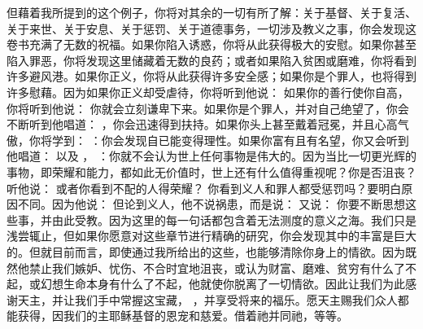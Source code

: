 但藉着我所提到的这个例子，你将对其余的一切有所了解：关于基督、关于复活、关于来世、关于安息、关于惩罚、关于道德事务，一切涉及教义之事，你会发现这卷书充满了无数的祝福。如果你陷入诱惑，你将从此获得极大的安慰。如果你甚至陷入罪恶，你将发现这里储藏着无数的良药；或者如果陷入贫困或磨难，你将看到许多避风港。如果你正义，你将从此获得许多安全感；如果你是个罪人，也将得到许多慰藉。因为如果你正义却受虐待，你将听到他说：    如果你的善行使你自高，你将听到他说：  你就会立刻谦卑下来。如果你是个罪人，并对自己绝望了，你会不断听到他唱道： ，你会迅速得到扶持。如果你头上甚至戴着冠冕，并且心高气傲，你将学到： ：你会发现自已能变得理性。如果你富有且有名望，你又会听到他唱道：  以及 ， ：你就不会认为世上任何事物是伟大的。因为当比一切更光辉的事物，即荣耀和能力，都如此无价值时，世上还有什么值得重视呢？你是否沮丧？听他说：  或者你看到不配的人得荣耀？  你看到义人和罪人都受惩罚吗？要明白原因不同。因为他说：  但论到义人，他不说祸患，而是说：  又说：    你要不断思想这些事，并由此受教。因为这里的每一句话都包含着无法测度的意义之海。我们只是浅尝辄止，但如果你愿意对这些章节进行精确的研究，你会发现其中的丰富是巨大的。但就目前而言，即使通过我所给出的这些，也能够清除你身上的情欲。因为既然他禁止我们嫉妒、忧伤、不合时宜地沮丧，或认为财富、磨难、贫穷有什么了不起，或幻想生命本身有什么了不起，他就使你脱离了一切情欲。因此让我们为此感谢天主，并让我们手中常握这宝藏， ，并享受将来的福乐。愿天主赐我们众人都能获得，因我们的主耶稣基督的恩宠和慈爱。借着祂并同祂，等等。\par

